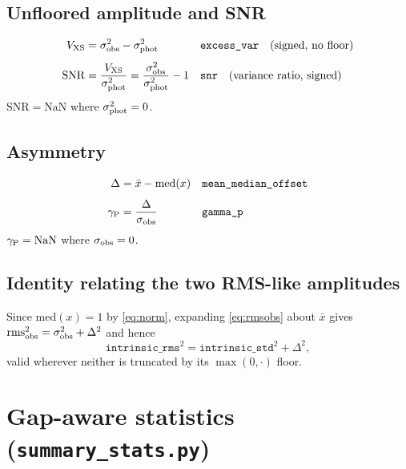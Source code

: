 \documentclass[11pt]{article}
\begin{document}
\subsection{Unfloored amplitude and SNR}

\begin{align}
  V_{\rm XS} &= \sigma_{\rm obs}^{2} - \sigma_{\rm phot}^{2}
  && \texttt{excess\_var} \quad \text{(signed, no floor)}
  \label{eq:vxs}\\[4pt]
  \mathrm{SNR} &= \frac{V_{\rm XS}}{\sigma_{\rm phot}^{2}}
              = \frac{\sigma_{\rm obs}^{2}}{\sigma_{\rm phot}^{2}} - 1
  && \texttt{snr} \quad \text{(variance ratio, signed)}
  \label{eq:snr}
\end{align}
%
$\mathrm{SNR} = \mathrm{NaN}$ where $\sigma_{\rm phot}^{2} = 0$.

\subsection{Asymmetry}

\begin{align}
  \Delta &= \bar{x} - \mathrm{med}(x)
  && \texttt{mean\_median\_offset}
  \label{eq:delta}\\[4pt]
  \gamma_{\rm P} &= \frac{\Delta}{\sigma_{\rm obs}}
  && \texttt{gamma\_p}
  \label{eq:gammap}
\end{align}
%
$\gamma_{\rm P} = \mathrm{NaN}$ where $\sigma_{\rm obs} = 0$.

\subsection{Identity relating the two RMS-like amplitudes}

Since $\mathrm{med}(x) = 1$ by \eqref{eq:norm}, expanding \eqref{eq:rmsobs} about
$\bar{x}$ gives $\mathrm{rms}_{\rm obs}^{2} = \sigma_{\rm obs}^{2} + \Delta^{2}$ and
hence
%
\begin{equation}
  \texttt{intrinsic\_rms}^{2} = \texttt{intrinsic\_std}^{2} + \Delta^{2},
  \label{eq:identity}
\end{equation}
%
valid wherever neither is truncated by its $\max(0,\cdot)$ floor.

\section{Gap-aware statistics (\texttt{summary\_stats.py})}
\end{document}

